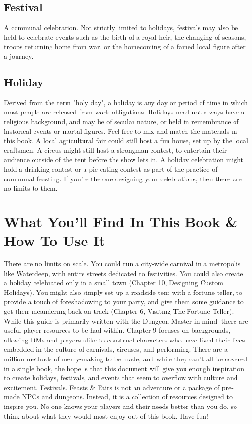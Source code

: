 \documentclass[10pt,a4paper,twoside,bg=print,twocolumn,openany,nodeprecatedcode]{dndbook}
\begin{document}
\subsection{Festival}
A communal celebration. Not strictly limited to holidays, festivals may also be held to celebrate events such as the birth of a royal heir, the changing of seasons, troops returning home from war, or the homecoming of a famed local figure after a journey.
\subsection{Holiday}
Derived from the term "holy day", a holiday is any day or period of time in which most people are released from work obligations. Holidays need not always have a religious background, and may be of secular nature, or held in remembrance of historical events or mortal figures. Feel free to mix-and-match the materials in this book. A local agricultural fair could still host a fun house, set up by the local craftsmen. A circus might still host a strongman contest, to entertain their audience outside of the tent before the show lets in. A holiday celebration might hold a drinking contest or a pie eating contest as part of the practice of communal feasting. If you're the one designing your celebrations, then there are no limits to them.
\section{What You'll Find In This Book \& How To Use It}
There are no limits on scale. You could run a city-wide carnival in a metropolis like Waterdeep, with entire streets dedicated to festivities. You could also create a holiday celebrated only in a small town (Chapter 10, Designing Custom Holidays). You might also simply set up a roadside tent with a fortune teller, to provide a touch of foreshadowing to your party, and give them some guidance to get their meandering back on track (Chapter 6, Visiting The Fortune Teller). While this guide is primarily written with the Dungeon Master in mind, there are useful player resources to be had within. Chapter 9 focuses on backgrounds, allowing DMs and players alike to construct characters who have lived their lives embedded in the culture of carnivals, circuses, and performing.
There are a million methods of merry-making to be made, and while they can't all be covered in a single book, the hope is that this document will give you enough inspiration to create holidays, festivals, and events that seem to overflow with culture and excitement. Festivals, Feasts \& Fairs is not an adventure or a package of pre-made NPCs and dungeons. Instead, it is a collection of resources designed to inspire you. No one knows your players and their needs better than you do, so think about what they would most enjoy out of this book. Have fun!
\end{document}
